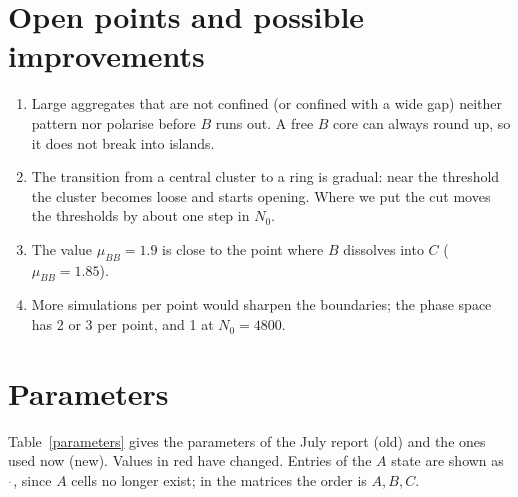 \documentclass{article}
\newcommand {\chg}[1]{\textcolor{BrickRed}{#1}}
\newcommand {\unused}{\textcolor{gray}{\cdot}}
\begin{document}
\section{Open points and possible improvements}

\begin{enumerate}
    \item Large aggregates that are not confined (or confined with a wide gap) neither pattern nor polarise before $B$ runs out. A free $B$ core can always round up, so it does not break into islands.
    \item The transition from a central cluster to a ring is gradual: near the threshold the cluster becomes loose and starts opening. Where we put the cut moves the thresholds by about one step in $N_0$.
    \item The value $\mu_{BB}=1.9$ is close to the point where $B$ dissolves into $C$ ($\mu_{BB}=1.85$).
    \item More simulations per point would sharpen the boundaries; the phase space has 2 or 3 per point, and 1 at $N_0=4800$.
\end{enumerate}



\newpage
\section{Parameters}

Table~\ref{parameters} gives the parameters of the July report (old) and the ones used now (new). Values in \chg{red} have changed. Entries of the $A$ state are shown as $\unused$, since $A$ cells no longer exist; in the matrices the order is $A, B, C$.
\end{document}
